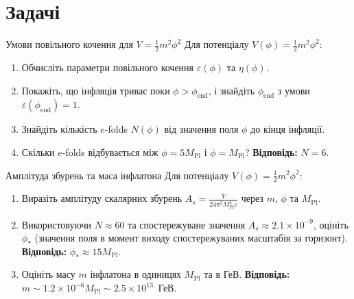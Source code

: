 \section*{Задачі}

\begin{problem}{Умови повільного кочення для $V = \frac{1}{2}m^2\phi^2$}
Для потенціалу $V(\phi) = \frac{1}{2}m^2\phi^2$:

\begin{enumerate}
    \item Обчисліть параметри повільного кочення $\varepsilon(\phi)$ та $\eta(\phi)$.
    \item Покажіть, що інфляція триває поки $\phi > \phi_{\text{end}}$, і знайдіть $\phi_{\text{end}}$ з умови $\varepsilon(\phi_{\text{end}}) = 1$.
    \item Знайдіть кількість $e$-folds $N(\phi)$ від значення поля $\phi$ до кінця інфляції.
    \item Скільки $e$-folds відбувається між $\phi = 5M_{\text{Pl}}$ і $\phi = M_{\text{Pl}}$? \textbf{Відповідь:} $N = 6$.
\end{enumerate}
\end{problem}


\begin{problem}{Амплітуда збурень та маса інфлатона}
Для потенціалу $V(\phi) = \frac{1}{2}m^2\phi^2$:

\begin{enumerate}
    \item Виразіть амплітуду скалярних збурень $A_s = \frac{V}{24\pi^2 M_{\text{Pl}}^4 \varepsilon}$ через $m$, $\phi$ та $M_{\text{Pl}}$.
    \item Використовуючи $N \approx 60$ та спостережуване значення $A_s \approx 2.1\times10^{-9}$,
          оцініть $\phi_*$ (значення поля в момент виходу спостережуваних масштабів за горизонт).
          \textbf{Відповідь:} $\phi_* \approx 15 M_{\text{Pl}}$.
    \item Оцініть масу $m$ інфлатона в одиницях $M_{\text{Pl}}$ та в $\text{ГеВ}$.
          \textbf{Відповідь:} $m \sim 1.2\times10^{-6} M_{\text{Pl}} \sim 2.5\times10^{13}$~ГеВ.
\end{enumerate}
\end{problem}


